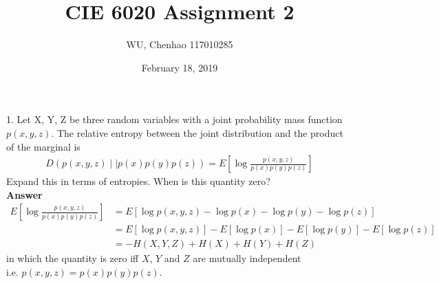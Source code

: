 \documentclass[12pt]{article}
\author{WU, Chenhao  117010285}
\title{CIE 6020 Assignment 2}
\date{February 18, 2019}
\begin{document}
	\maketitle
	\par
	1. Let X, Y, Z be three random variables with a joint probability mass function $p(x,y,z)$. The relative entropy between the joint distribution and the product of the marginal is 
	\begin{align*}
		D(p(x,y,z){\mid}{\mid}p(x)p(y)p(z)) = E[\log\frac{p(x,y,z)}{p(x)p(y)p(z)}]
	\end{align*}
	Expand this in terms of entropies. When is this quantity zero?\\
	\textbf{Answer} 
	\begin{align*}
		E[\log\frac{p(x,y,z)}{p(x)p(y)p(z)}] &= E[\log p(x,y,z) - \log p(x) - \log p(y) - \log p(z)] \\
								             &= E[\log p(x,y,z)] - E[\log p(x)] - E[\log p(y)] - E[\log p(z)] \\
								             &= -H(X,Y,Z) + H(X) + H(Y) + H(Z)
	\end{align*}
	in which the quantity is zero iff $X$, $Y$ and $Z$ are mutually independent \\
	i.e. $p(x,y,z) = p(x)p(y)p(z)$.\\
	
\end{document}
